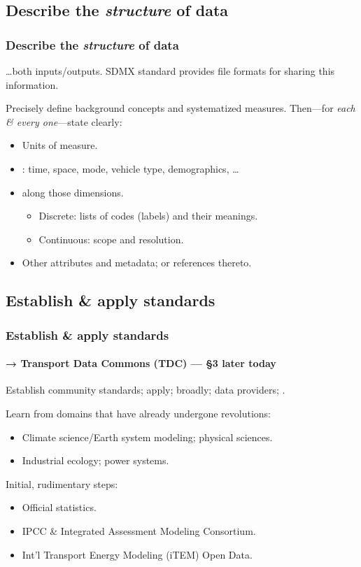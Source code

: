 \documentclass[14pt,aspectratio=169]{beamer}
\begin{document}
\subsection{Describe the \emph{structure} of data}

\begin{frame}
\frametitle{Describe the \emph{structure} of data}

…both inputs/outputs.
SDMX standard provides file formats for sharing this information.

\bigskip
Precisely define background concepts and systematized measures.
Then—for \emph{each \& every one}—state clearly:
\begin{itemize}
  \item Units of measure.
  \item {}: time, space, mode, vehicle type, demographics, …
  \item {} along those dimensions.
    \begin{itemize}
      \item Discrete: lists of codes (labels) and their meanings.
      \item Continuous: scope and resolution.
    \end{itemize}
  \item Other attributes and metadata; or references thereto.
\end{itemize}

\end{frame}

\subsection{Establish \& apply standards}

\begin{frame}
\frametitle{Establish \& apply standards}
\framesubtitle{→ Transport Data Commons (TDC) — §3 later today}

Establish community standards; apply;  broadly;  data providers; .

\bigskip
\pause
Learn from domains that have already undergone revolutions:
\begin{itemize}
  \item Climate science/Earth system modeling; physical sciences.
  \item Industrial ecology; power systems.
\end{itemize}

\bigskip
\pause
Initial, rudimentary steps:
\begin{itemize}
  \item Official statistics.
  \item IPCC \& Integrated Assessment Modeling Consortium.
  \item Int'l Transport Energy Modeling (iTEM) Open Data.
\end{itemize}

\end{frame}
\end{document}
